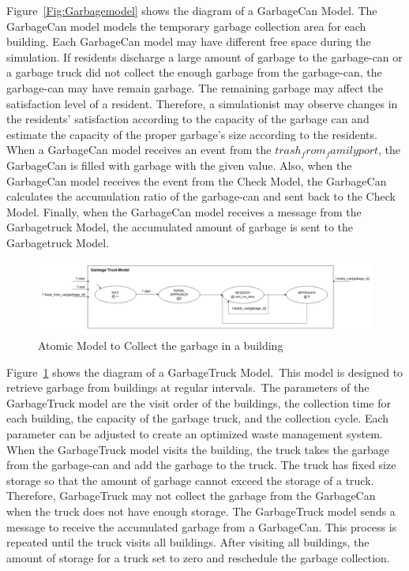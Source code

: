 \documentclass{scsSimAUDPaperFormat}
\begin{document}
Figure~\ref{Fig:Garbagemodel} shows the diagram of a GarbageCan Model. The GarbageCan model models the temporary garbage collection area for each building. Each GarbageCan model may have different free space during the simulation. If residents discharge a large amount of garbage to the garbage-can or a garbage truck did not collect the enough garbage from the garbage-can, the garbage-can may have remain garbage. The remaining garbage may affect the satisfaction level of a resident. Therefore, a simulationist may observe changes in the residents' satisfaction according to the capacity of the garbage can and estimate the capacity of the proper garbage's size according to the residents. 
When a GarbageCan model receives an event from the $trash_from_family port$, the GarbageCan is filled with garbage with the given value. Also, when the GarbageCan model receives the event from the Check Model, the GarbageCan calculates the accumulation ratio of the garbage-can and sent back to the Check Model. Finally, when the GarbageCan model receives a message from the Garbagetruck Model, the accumulated amount of garbage is sent to the Garbagetruck Model.

\begin{figure}[!ht]
    \centering
    \includegraphics[width=1.0\columnwidth]{fig/garbagetruck_model.jpg}
    \caption{Atomic Model to Collect the garbage in a building}
    \label{Fig:garbageTruckmodel}
\end{figure}

Figure~\ref{Fig:garbageTruckmodel} shows the diagram of a GarbageTruck Model.~This model is designed to retrieve garbage from buildings at regular intervals.~The parameters of the GarbageTruck model are the visit order of the buildings, the collection time for each building, the capacity of the garbage truck, and the collection cycle. Each parameter can be adjusted to create an optimized waste management system. 
When the GarbageTruck model visits the building, the truck takes the garbage from the garbage-can and add the garbage to the truck. The truck has fixed size storage so that the amount of garbage cannot exceed the storage of a truck. Therefore, GarbageTruck may not collect the garbage from the GarbageCan when the truck does not have enough storage. 
The GarbageTruck model sends a message to receive the accumulated garbage from a GarbageCan. This process is repeated until the truck visits all buildings. After visiting all buildings, the amount of storage for a truck set to zero and reschedule the garbage collection. 
\end{document}
